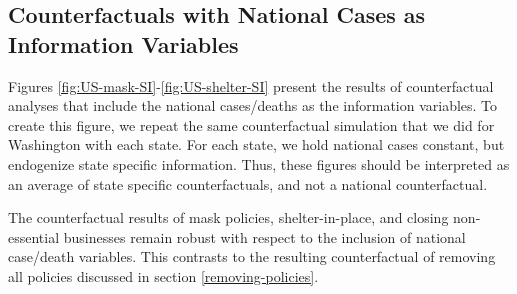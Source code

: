 \documentclass[11pt,reqno,letter]{amsart}
\theoremstyle{definition}
\begin{document}
\FloatBarrier

\subsection{Counterfactuals with National Cases as Information
  Variables}

Figures \ref{fig:US-mask-SI}-\ref{fig:US-shelter-SI}  present the results of counterfactual analyses that include the national cases/deaths as the information variables. To create this figure, we repeat the same counterfactual
simulation that we did for Washington with each state. For each state,
we hold national cases constant, but endogenize state specific
information. Thus, these figures should be interpreted as an average
of state specific counterfactuals, and not a national counterfactual.

 The counterfactual results of mask policies, shelter-in-place,
 and closing non-essential businesses remain robust with respect to the inclusion of national case/death variables. This contrasts to the resulting counterfactual of  removing all policies  discussed in section \ref{removing-policies}.
\end{document}
